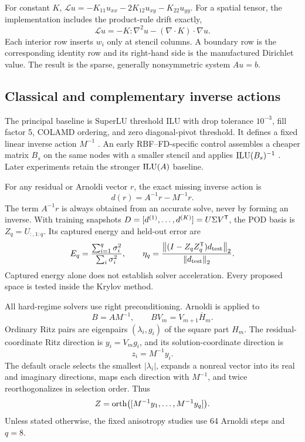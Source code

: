 For constant $K$, $\mathcal L u=-K_{11}u_{xx}-2K_{12}u_{xy}-K_{22}u_{yy}$.  For a spatial tensor, the implementation includes the product-rule drift exactly,
\begin{equation}
 \mathcal L u=-K:\nabla^2u-(\nabla\!\cdot K)\cdot\nabla u.
 \label{eq:variableoperator}
\end{equation}
Each interior row inserts $w_i$ only at stencil columns.  A boundary row is the corresponding identity row and its right-hand side is the manufactured Dirichlet value.  The result is the sparse, generally nonsymmetric system $Au=b$.  
\subsection{Classical and complementary inverse actions}

The principal baseline is SuperLU threshold ILU with drop tolerance $10^{-3}$, fill factor 5, COLAMD ordering, and zero diagonal-pivot threshold.  It defines a fixed linear inverse action $M^{-1}$ \citep{saad1994ilut}.  An early RBF--FD-specific control assembles a cheaper matrix $B_s$ on the same nodes with a smaller stencil and applies $\operatorname{ILU}(B_s)^{-1}$ \citep{koch2025smaller}.  Later experiments retain the stronger $\operatorname{ILU}(A)$ baseline.

For any residual or Arnoldi vector $r$, the exact missing inverse action is
\begin{equation}
 d(r)=A^{-1}r-M^{-1}r.
 \label{eq:missing}
\end{equation}
The term $A^{-1}r$ is always obtained from an accurate solve, never by forming an inverse.  With training snapshots $D=[d^{(1)},\ldots,d^{(K)}]=U\Sigma V^{\mathsf T}$, the POD basis is $Z_q=U_{:,1:q}$.  Its captured energy and held-out error are
\begin{equation}
 E_q=\frac{\sum_{i=1}^q\sigma_i^2}{\sum_i\sigma_i^2},
 \qquad
 \eta_q=\frac{\left\lVert (I-Z_qZ_q^{\mathsf T})d_{\rm test}\right\rVert_2}{\left\lVert d_{\rm test}\right\rVert_2}.
 \label{eq:podmetrics}
\end{equation}
Captured energy alone does not establish solver acceleration. Every proposed space is tested inside the Krylov method.

All hard-regime solvers use right preconditioning.  Arnoldi is applied to
\begin{equation}
 B=AM^{-1},\qquad BV_m=V_{m+1}\overline H_m.
 \label{eq:rightoperator}
\end{equation}
Ordinary Ritz pairs are eigenpairs $(\lambda_i,g_i)$ of the square part $H_m$.  The residual-coordinate Ritz direction is $y_i=V_mg_i$, and its solution-coordinate direction is
\begin{equation}
 z_i=M^{-1}y_i.
 \label{eq:ritzmap}
\end{equation}
The default oracle selects the smallest $|\lambda_i|$, expands a nonreal vector into its real and imaginary directions, maps each direction with $M^{-1}$, and twice reorthogonalizes in selection order.  Thus
\begin{equation}
 Z=\operatorname{orth}\bigl([M^{-1}y_1,\ldots,M^{-1}y_q]\bigr).
 \label{eq:ritzspace}
\end{equation}
Unless stated otherwise, the fixed anisotropy studies use 64 Arnoldi steps and $q=8$.


